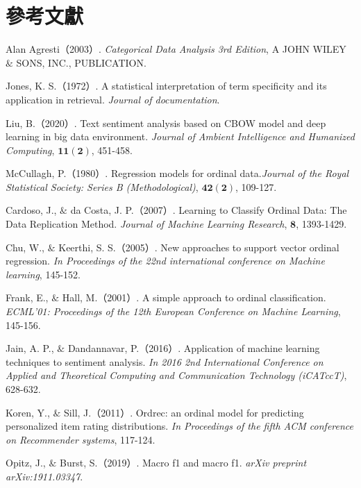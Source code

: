 %
%
\fontsize{12}{22pt}\selectfont
\cleardoublepage
\thispagestyle{empty}
\setlength{\parindent}{2em}
\chapter*{參考文獻}

\noindent Alan Agresti（2003）. \textit{Categorical Data Analysis 3rd Edition}, A JOHN WILEY $\&$ SONS, INC., PUBLICATION.

\noindent Jones, K. S.（1972）. A statistical interpretation of term specificity and its application in retrieval. \textit{Journal of documentation}.

\noindent Liu, B.（2020）. Text sentiment analysis based on CBOW model and deep learning in big data environment. \textit{Journal of Ambient Intelligence and Humanized Computing}, $\bm{11(2)}$, 451-458.

\noindent McCullagh, P.（1980）. Regression models for ordinal data.\textit{Journal of the Royal Statistical Society: Series B (Methodological)}, $\bm{42(2)}$, 109-127.

\noindent Cardoso, J., $\&$ da Costa, J. P.（2007）. Learning to Classify Ordinal Data: The Data Replication Method. \textit{Journal of Machine Learning Research}, $\bm{8}$, 1393-1429.

\noindent Chu, W., $\&$ Keerthi, S. S.（2005）. New approaches to support vector ordinal regression. \textit{In Proceedings of the 22nd international conference on Machine learning}, 145-152.

\noindent Frank, E., $\&$ Hall, M.（2001）. A simple approach to ordinal classification. \textit{ECML'01: Proceedings of the 12th European Conference on Machine Learning}, 145-156.

\noindent Jain, A. P., $\&$ Dandannavar, P.（2016）. Application of machine learning techniques to sentiment analysis. \textit{In 2016 2nd International Conference on Applied and Theoretical Computing and Communication Technology (iCATccT)}, 628-632.

\noindent Koren, Y., $\&$ Sill, J.（2011）. Ordrec: an ordinal model for predicting personalized item rating distributions. \textit{In Proceedings of the fifth ACM conference on Recommender systems}, 117-124.


\newpage 


\noindent Opitz, J., $\&$ Burst, S.（2019）. Macro f1 and macro f1. \textit{arXiv preprint arXiv:1911.03347}.

